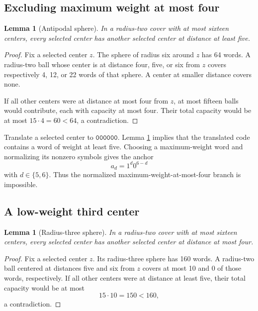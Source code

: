\documentclass[11pt]{article}
\newtheorem{lemma}[theorem]{Lemma}
\newcommand{\codeword}[1]{\texttt{#1}}
\begin{document}
\subsection{Excluding maximum weight at most four}

\begin{lemma}[Antipodal sphere]
\label{lem:antipodal}
In a radius-two cover with at most sixteen centers, every selected center
has another selected center at distance at least five.
\end{lemma}

\begin{proof}
Fix a selected center \(z\).  The sphere of radius six around \(z\) has
64 words.  A radius-two ball whose center is at distance four, five, or six
from \(z\) covers respectively 4, 12, or 22 words of that sphere.  A center
at smaller distance covers none.

If all other centers were at distance at most four from \(z\), at most
fifteen balls would contribute, each with capacity at most four.  Their
total capacity would be at most \(15\cdot4=60<64\), a contradiction.
\end{proof}

Translate a selected center to \(\codeword{000000}\).  Lemma
\ref{lem:antipodal} implies that the translated code contains a word of
weight at least five.  Choosing a maximum-weight word and normalizing its
nonzero symbols gives the anchor
\[
  a_d=1^d0^{6-d}
\]
with \(d\in\{5,6\}\).  Thus the normalized maximum-weight-at-most-four
branch is impossible.

\subsection{A low-weight third center}

\begin{lemma}[Radius-three sphere]
\label{lem:radius-three}
In a radius-two cover with at most sixteen centers, every selected center
has another selected center at distance at most four.
\end{lemma}

\begin{proof}
Fix a selected center \(z\).  Its radius-three sphere has 160 words.  A
radius-two ball centered at distances five and six from \(z\) covers at
most 10 and 0 of those words, respectively.  If all other centers were at
distance at least five, their total capacity would be at most
\[
  15\cdot10=150<160,
\]
a contradiction.
\end{proof}
\end{document}
